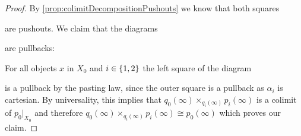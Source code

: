 \begin{lemma}
\begin{proof}
        By \cref{prop:colimitDecompositionPushouts} we know that both squares
        \begin{center}
        \end{center}
        are pushouts.
        We claim that the diagrams
        \begin{center}
        \end{center}
        are pullbacks: 

        For all objects $x$ in $X_0$ and $i\in\left\lbrace1,2\right\rbrace$ the left square of the diagram 
        \begin{center}
        \end{center}
        is a pullback by the pasting law, since the outer square is a pullback as $\alpha_i$ is cartesian.
        By universality, this implies that $q_0(\infty)\times_{q_i(\infty)}p_i(\infty)$ is a colimit of $p_0|_{X_0}$ and therefore $q_0(\infty)\times_{q_i(\infty)}p_i(\infty)\cong p_0(\infty)$ which proves our claim.


\end{proof}
\end{lemma}
